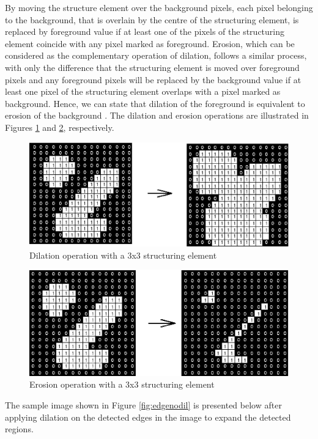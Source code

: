 By moving the structure element over the background pixels, each pixel belonging to the background, that 
is overlain by the centre of the structuring element, is replaced by foreground value if at least one of the pixels of the structuring element coincide with any pixel marked as foreground.
Erosion, which can be considered as the complementary operation of dilation, follows a similar process, with only the difference that the 
structuring element is moved over foreground pixels and any
foreground pixels will be replaced by the background value if at least one pixel of the structuring element overlaps with a pixel marked as background.
Hence, we can state that dilation of the foreground is equivalent to erosion of the background \cite{ritt00}.
The dilation and erosion operations are illustrated in Figures \ref{fig:dilate} and \ref{fig:erode}, respectively.

\begin{figure}[H]
\centering
\includegraphics[scale=0.8]{diltbin}
\caption{Dilation operation with a 3x3 structuring element \cite{HIPRdil}}
\label{fig:dilate}
\end{figure} 

\begin{figure}[H]
\centering
\includegraphics[scale=0.8]{erodbin}
\caption{Erosion operation with a 3x3 structuring element \cite{HIPRerod}}
\label{fig:erode}
\end{figure} 
The sample image shown in Figure \ref{fig:edgenodil} is presented below after applying dilation on the detected edges in the image to expand the 
detected regions.

